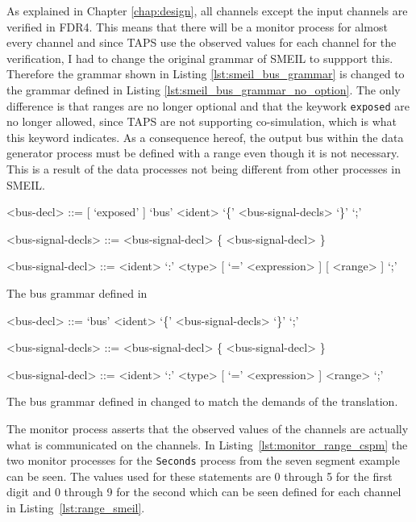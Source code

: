 As explained in Chapter \ref{chap:design}, all channels except the input channels are verified in FDR4. This means that there will be a monitor process for almost every channel and since TAPS use the observed values for each channel for the verification, I had to change the original grammar of SMEIL to suppport this. Therefore the grammar shown in Listing \ref{lst:smeil_bus_grammar} is changed to the grammar defined in Listing \ref{lst:smeil_bus_grammar_no_option}. The only difference is that ranges are no longer optional and that the keywork \texttt{exposed} are no longer allowed, since TAPS are not supporting co-simulation, which is what this keyword indicates. As a consequence hereof, the output bus within the data generator process must be defined with a range even though it is not necessary. This is a result of the data processes not being different from other processes in SMEIL.\\
\begin{listing}
    \begin{grammar}
    <bus-decl> ::= [ `exposed' ] `bus' <ident> `\{' <bus-signal-decls> `\}'  `;'

    <bus-signal-decls> ::= <bus-signal-decl> \{ <bus-signal-decl> \}

    <bus-signal-decl> ::= <ident> `:' <type> [ `=' <expression> ] [ <range> ] `;'
    \end{grammar}
    \caption{The bus grammar defined in \cite{Asheim2018}}
    \label{lst:smeil_bus_grammar}
\end{listing}
\begin{listing}
    \begin{grammar}
    <bus-decl> ::= `bus' <ident> `\{' <bus-signal-decls> `\}'  `;'

    <bus-signal-decls> ::= <bus-signal-decl> \{ <bus-signal-decl> \}

    <bus-signal-decl> ::= <ident> `:' <type> [ `=' <expression> ] <range> `;'
    \end{grammar}
    \caption{The bus grammar defined in \cite{Asheim2018} changed to match the demands of the translation.}
    \label{lst:smeil_bus_grammar_no_option}
\end{listing}
The monitor process asserts that the observed values of the \cspm{} channels are actually what is communicated on the channels. In Listing~\ref{lst:monitor_range_cspm} the two monitor processes for the \texttt{Seconds} process from the seven segment example can be seen. The values used for these statements are 0 through 5 for the first digit and 0 through 9 for the second which can be seen defined for each channel in Listing~\ref{lst:range_smeil}.
